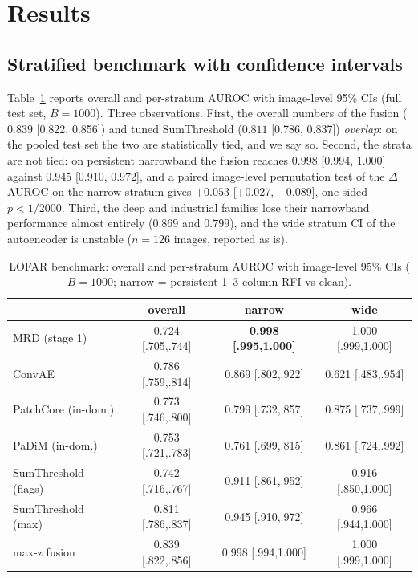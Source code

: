 \documentclass[journal]{IEEEtran}
\begin{document}
\section{Results}
\label{sec:results}
\subsection{Stratified benchmark with confidence intervals}
Table~\ref{tab:main} reports overall and per-stratum AUROC with image-level
95\% CIs (full test set, $B=1000$).  Three observations.  First, the overall
numbers of the fusion ($0.839$ [0.822, 0.856]) and tuned SumThreshold
($0.811$ [0.786, 0.837]) \emph{overlap}: on the pooled test set the two are
statistically tied, and we say so.  Second, the strata are not tied: on
persistent narrowband the fusion reaches $0.998$ [0.994, 1.000] against
$0.945$ [0.910, 0.972], and a paired image-level permutation test of the
$\Delta$AUROC on the narrow stratum gives $+0.053$ [+0.027, +0.089],
one-sided $p<1/2000$.  Third, the deep and industrial families lose their
narrowband performance almost entirely ($0.869$ and $0.799$), and the wide
stratum CI of the autoencoder is unstable ($n=126$ images, reported as is).

\begin{table}[!t]
\centering
\caption{LOFAR benchmark: overall and per-stratum AUROC with image-level
95\% CIs ($B=1000$; narrow = persistent 1--3 column RFI vs clean).}
\label{tab:main}
\footnotesize
\setlength{\tabcolsep}{2.6pt}
\begin{tabular}{lccc}
\toprule
 & overall & narrow & wide \\
\midrule
MRD (stage 1)        & 0.724 [.705,.744] & \textbf{0.998 [.995,1.000]} & 1.000 [.999,1.000] \\
ConvAE               & 0.786 [.759,.814] & 0.869 [.802,.922] & 0.621 [.483,.954] \\
PatchCore (in-dom.)  & 0.773 [.746,.800] & 0.799 [.732,.857] & 0.875 [.737,.999] \\
PaDiM (in-dom.)      & 0.753 [.721,.783] & 0.761 [.699,.815] & 0.861 [.724,.992] \\
SumThreshold (flags) & 0.742 [.716,.767] & 0.911 [.861,.952] & 0.916 [.850,1.000] \\
SumThreshold (max)   & 0.811 [.786,.837] & 0.945 [.910,.972] & 0.966 [.944,1.000] \\
max-z fusion         & 0.839 [.822,.856] & 0.998 [.994,1.000] & 1.000 [.999,1.000] \\
\bottomrule
\end{tabular}
\end{table}
\end{document}
